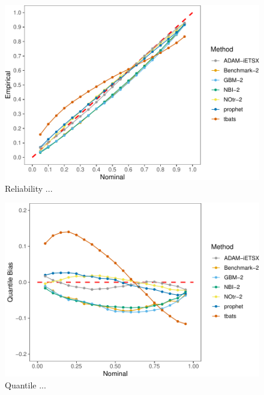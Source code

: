 \documentclass[]{elsarticle} %
\begin{document}
\begin{figure}[H]

{\centering \includegraphics[width=0.9\linewidth]{paper_files/figure-latex/Reliability-1} 

}

\caption{Reliability ...}\label{fig:Reliability}
\end{figure}

\begin{figure}[H]

{\centering \includegraphics[width=0.9\linewidth]{paper_files/figure-latex/quantile-bias-1} 

}

\caption{Quantile ...}\label{fig:quantile-bias}
\end{figure}
\end{document}
